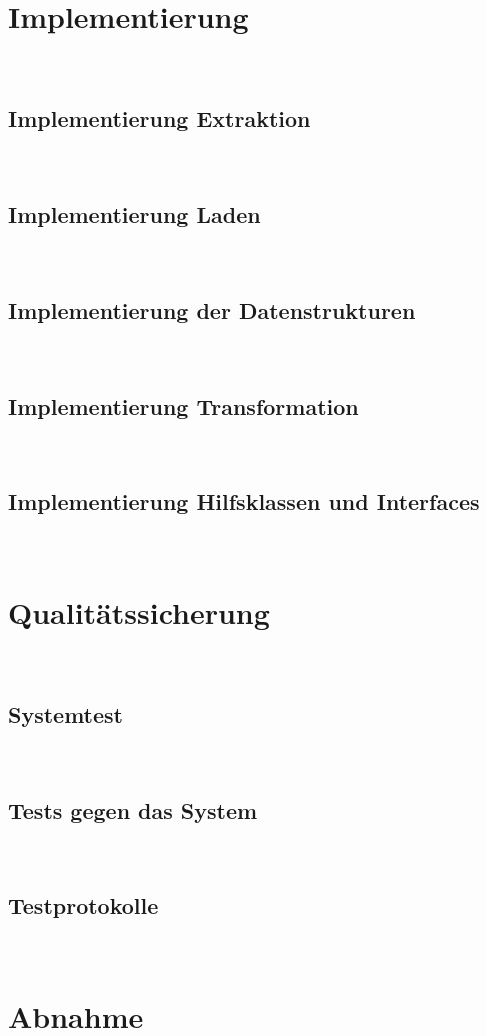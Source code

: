 \documentclass[11pt,toc=sectionentrywithoutdots, 
headheight=44pt, headings=optiontoheadandtoc, hyperfootnotes=false]{scrartcl}
\begin{document}
\section{Implementierung}
\blindtext\

\subsection{Implementierung Extraktion}
\blindtext\

\subsection{Implementierung Laden}
\blindtext\

\subsection{Implementierung der Datenstrukturen}
\blindtext\

\subsection{Implementierung Transformation}
\blindtext\

\subsection{Implementierung Hilfsklassen und Interfaces}
\blindtext\

\section{Qualitätssicherung}
\blindtext\

\subsection{Systemtest}
\blindtext\

\subsection{Tests gegen das System}
\blindtext\

\subsection{Testprotokolle}
\blindtext\

\section{Abnahme}
\blindtext\
\end{document}
